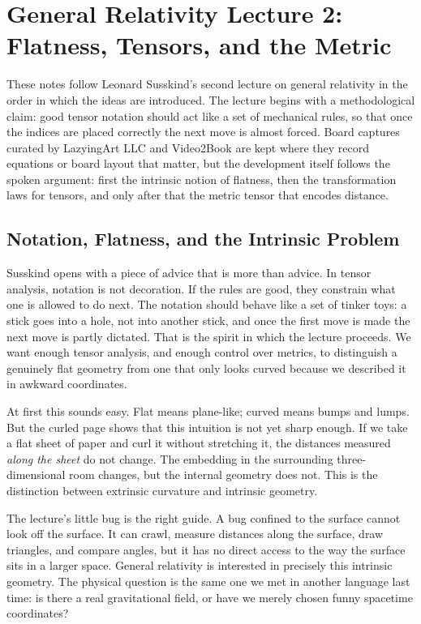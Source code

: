 \chapter{General Relativity Lecture 2: Flatness, Tensors, and the Metric}

These notes follow Leonard Susskind's second lecture on general relativity in the order in which the ideas are introduced. The lecture begins with a methodological claim: good tensor notation should act like a set of mechanical rules, so that once the indices are placed correctly the next move is almost forced. Board captures curated by LazyingArt LLC and Video2Book are kept where they record equations or board layout that matter, but the development itself follows the spoken argument: first the intrinsic notion of flatness, then the transformation laws for tensors, and only after that the metric tensor that encodes distance.

\section{Notation, Flatness, and the Intrinsic Problem}

Susskind opens with a piece of advice that is more than advice. In tensor analysis, notation is not decoration. If the rules are good, they constrain what one is allowed to do next. The notation should behave like a set of tinker toys: a stick goes into a hole, not into another stick, and once the first move is made the next move is partly dictated. That is the spirit in which the lecture proceeds. We want enough tensor analysis, and enough control over metrics, to distinguish a genuinely flat geometry from one that only looks curved because we described it in awkward coordinates.

At first this sounds easy. Flat means plane-like; curved means bumps and lumps. But the curled page shows that this intuition is not yet sharp enough. If we take a flat sheet of paper and curl it without stretching it, the distances measured \emph{along the sheet} do not change. The embedding in the surrounding three-dimensional room changes, but the internal geometry does not. This is the distinction between extrinsic curvature and intrinsic geometry.

The lecture's little bug is the right guide. A bug confined to the surface cannot look off the surface. It can crawl, measure distances along the surface, draw triangles, and compare angles, but it has no direct access to the way the surface sits in a larger space. General relativity is interested in precisely this intrinsic geometry. The physical question is the same one we met in another language last time: is there a real gravitational field, or have we merely chosen funny spacetime coordinates?


